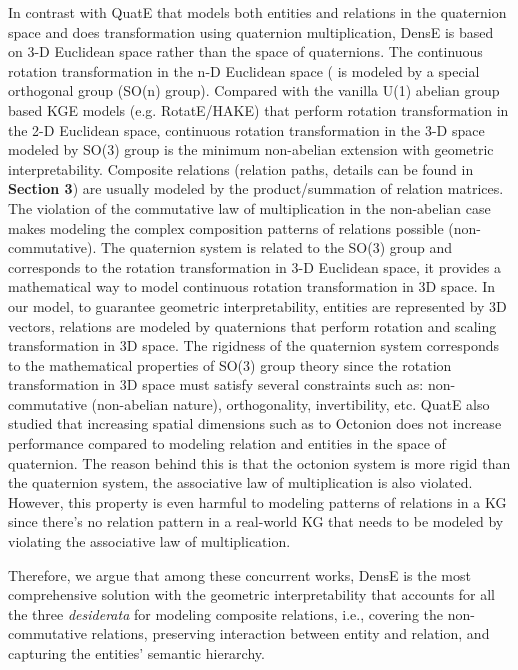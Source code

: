 \documentclass[11pt]{article}
\begin{document}
In contrast with QuatE that models both entities and relations in the quaternion space and does transformation using quaternion multiplication, DensE is based on 3-D Euclidean space rather than the space of quaternions. The continuous rotation transformation in the n-D Euclidean space ( is modeled by a special orthogonal group (SO(n) group). 
Compared with the vanilla U(1) abelian group based KGE models (e.g. RotatE/HAKE) that perform rotation transformation in the 2-D Euclidean space, continuous rotation transformation in the 3-D space modeled by SO(3) group is the minimum non-abelian extension with geometric interpretability. 
Composite relations (relation paths, details can be found in \textbf{Section 3}) are usually modeled by the product/summation of relation matrices. The violation of the commutative law of multiplication in the non-abelian case makes modeling the complex composition patterns of relations possible (non-commutative). 
The quaternion system is related to the SO(3) group and corresponds to the rotation transformation in 3-D Euclidean space, it provides a mathematical way to model continuous rotation transformation in 3D space. In our model, to guarantee geometric interpretability, entities are represented by 3D vectors, relations are modeled by quaternions that perform rotation and scaling transformation in 3D space. 
The rigidness of the quaternion system corresponds to the mathematical properties of SO(3) group theory since the rotation transformation in 3D space must satisfy several constraints such as: non-commutative (non-abelian nature), orthogonality, invertibility, etc. 
QuatE also studied that increasing spatial dimensions such as to Octonion does not increase performance compared to modeling relation and entities in the space of quaternion. The reason behind this is that the octonion system is more rigid than the quaternion system, the associative law of multiplication is also violated. However, this property is even harmful to modeling patterns of relations in a KG since there’s no relation pattern in a real-world KG that needs to be modeled by violating the associative law of multiplication.

Therefore, we argue that among these concurrent works, DensE is the most comprehensive solution with the geometric interpretability that accounts for all the three \textit{desiderata} for modeling composite relations, i.e., covering the non-commutative relations, preserving interaction between entity and relation, and capturing the entities' semantic hierarchy.
\end{document}

